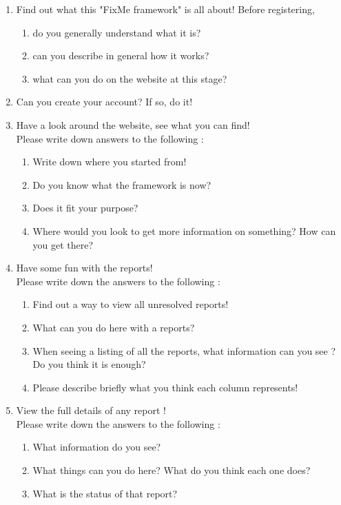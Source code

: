 \documentclass[12pt]{article}
\begin{document}
\begin{enumerate}

\item Find out what this "FixMe framework" is all about!
Before registering, 
\begin{enumerate}
\item do you generally understand what it is?
\item can you describe in general how it works?
\item what can you do on the website at this stage?
\end{enumerate}

\item Can you create your account? If so, do it!

\item Have a look around the website, see what you can find!\\
Please write down answers to the following :
\begin{enumerate}
\item Write down where you started from!
\item Do you know what the framework is now?
\item Does it fit your purpose?
\item Where would you look to get more information on something? How can you get there?
\end{enumerate}

\item Have some fun with the reports!\\
Please write down the answers to the following :
\begin{enumerate}
\item Find out a way to view all unresolved reports!
\item What can you do here with a reports?
\item When seeing a listing of all the reports, what information can you see ? Do you think it is enough?
\item Please describe briefly what you think each column represents!
\end{enumerate}

\item View the full details of any report ! \\
Please write down the answers to the following :
\begin{enumerate}
\item What information do you see?
\item What things can you do here? What do you think each one does?
\item What is the status of that report?
\end{enumerate}


\end{enumerate}
\end{document}
